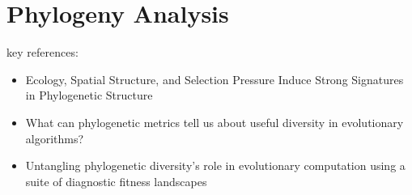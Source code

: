 \section{Phylogeny Analysis}

key references:
\begin{itemize}
  \item Ecology, Spatial Structure, and Selection Pressure Induce Strong Signatures in Phylogenetic Structure \citep{moreno2024ecology}
  \item What can phylogenetic metrics tell us about useful diversity in evolutionary algorithms? \citep{hernandez2022can}
  \item Untangling phylogenetic diversity's role in evolutionary computation using a suite of diagnostic fitness landscapes \citep{shahbandegan2022untangling}
\end{itemize}
